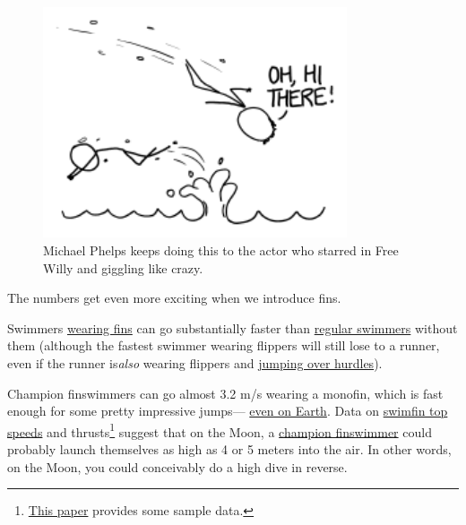 {\begin{figure}[!htbp]
\centering
\includegraphics[scale=0.5, max width=0.8\textwidth]{imgs/a/124/jump.png}
\caption{Michael Phelps keeps doing this to the actor who starred in Free Willy and giggling like crazy.}
\end{figure}

{The numbers get even more exciting when we introduce fins.}

{Swimmers \href{http://en.wikipedia.org/wiki/Finswimming}{wearing fins} can go substantially faster than \href{http://en.wikipedia.org/wiki/David\_Schwimmer}{regular swimmers} without them (although the fastest swimmer wearing flippers will still lose to a runner, even if the runner is\emph{also} wearing flippers and \href{https://www.youtube.com/watch?v=sRDnajV1A3w}{jumping over hurdles}).}

{Champion finswimmers can go almost 3.2 m/s wearing a monofin, which is fast enough for some pretty impressive jumps— \href{https://www.youtube.com/watch?v=z09RmuaPyVU}{even on Earth}. Data on \href{http://en.wikipedia.org/wiki/List\_of\_world\_records\_in\_finswimming}{swimfin top speeds} and thrusts{\footnote{ \href{http://archive.rubicon-foundation.org/xmlui/bitstream/handle/123456789/3936/12841609.pdf}{This paper} provides some sample data.} } suggest that on the Moon, a \href{http://en.wikipedia.org/wiki/Hanna-Maria\_Sepp\%C3\%A4l\%C3\%A4}{champion finswimmer} could probably launch themselves as high as 4 or 5 meters into the air. In other words, on the Moon, you could conceivably do a high dive in reverse.}

}
